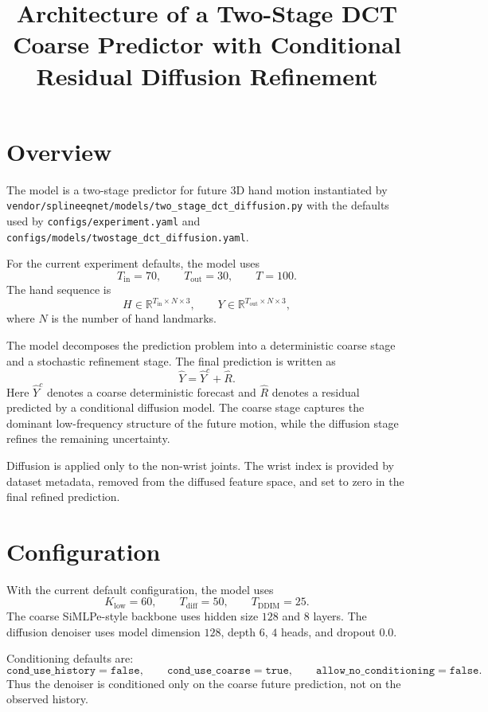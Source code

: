 \documentclass[11pt]{article}
\begin{document}
\title{Architecture of a Two-Stage DCT Coarse Predictor with Conditional Residual Diffusion Refinement}
\author{}
\date{}
\maketitle

\section{Overview}

The model is a two-stage predictor for future 3D hand motion instantiated by
\texttt{vendor/splineeqnet/models/two\_stage\_dct\_diffusion.py}
with the defaults used by
\texttt{configs/experiment.yaml} and
\texttt{configs/models/twostage\_dct\_diffusion.yaml}.

For the current experiment defaults, the model uses
\[
T_{\mathrm{in}} = 70,
\qquad
T_{\mathrm{out}} = 30,
\qquad
T = 100.
\]
The hand sequence is
\[
H \in \mathbb{R}^{T_{\mathrm{in}} \times N \times 3},
\qquad
Y \in \mathbb{R}^{T_{\mathrm{out}} \times N \times 3},
\]
where $N$ is the number of hand landmarks.

The model decomposes the prediction problem into a deterministic coarse stage and a stochastic refinement stage. The final prediction is written as
\[
\hat{Y} = \hat{Y}^{c} + \hat{R}.
\]
Here $\hat{Y}^{c}$ denotes a coarse deterministic forecast and $\hat{R}$ denotes a residual predicted by a conditional diffusion model. The coarse stage captures the dominant low-frequency structure of the future motion, while the diffusion stage refines the remaining uncertainty.

Diffusion is applied only to the non-wrist joints. The wrist index is provided by dataset metadata, removed from the diffused feature space, and set to zero in the final refined prediction.

\section{Configuration}

With the current default configuration, the model uses
\[
K_{\mathrm{low}} = 60,
\qquad
T_{\mathrm{diff}} = 50,
\qquad
T_{\mathrm{DDIM}} = 25.
\]
The coarse SiMLPe-style backbone uses hidden size $128$ and $8$ layers. The diffusion denoiser uses model dimension $128$, depth $6$, $4$ heads, and dropout $0.0$.

Conditioning defaults are:
\[
\texttt{cond\_use\_history} = \texttt{false},
\qquad
\texttt{cond\_use\_coarse} = \texttt{true},
\qquad
\texttt{allow\_no\_conditioning} = \texttt{false}.
\]
Thus the denoiser is conditioned only on the coarse future prediction, not on the observed history.
\end{document}
